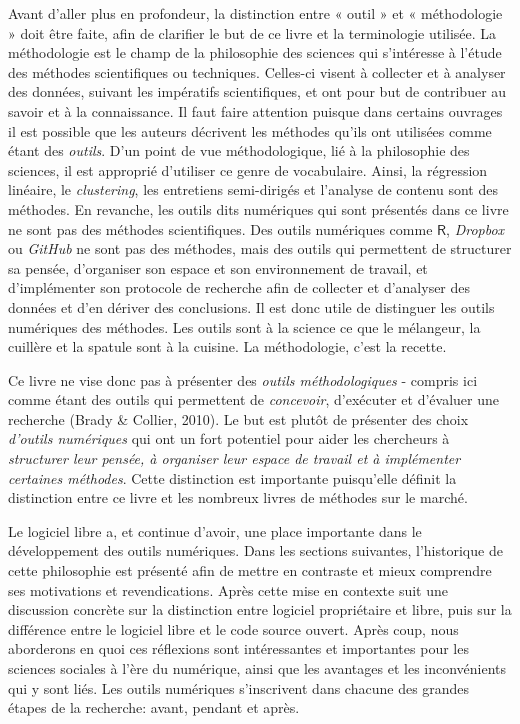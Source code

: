 \documentclass[
  letterpaper,
  DIV=11,
  numbers=noendperiod,
  oneside]{scrreprt}
\begin{document}
Avant d'aller plus en profondeur, la distinction entre « outil » et «
méthodologie » doit être faite, afin de clarifier le but de ce livre et
la terminologie utilisée. La méthodologie est le champ de la philosophie
des sciences qui s'intéresse à l'étude des méthodes scientifiques ou
techniques. Celles-ci visent à collecter et à analyser des données,
suivant les impératifs scientifiques, et ont pour but de contribuer au
savoir et à la connaissance. Il faut faire attention puisque dans
certains ouvrages il est possible que les auteurs décrivent les méthodes
qu'ils ont utilisées comme étant des \emph{outils}. D'un point de vue
méthodologique, lié à la philosophie des sciences, il est approprié
d'utiliser ce genre de vocabulaire. Ainsi, la régression linéaire, le
\emph{clustering}, les entretiens semi-dirigés et l'analyse de contenu
sont des méthodes. En revanche, les outils dits numériques qui sont
présentés dans ce livre ne sont pas des méthodes scientifiques. Des
outils numériques comme \(\textsf{R}\), \emph{Dropbox} ou \emph{GitHub}
ne sont pas des méthodes, mais des outils qui permettent de structurer
sa pensée, d'organiser son espace et son environnement de travail, et
d'implémenter son protocole de recherche afin de collecter et d'analyser
des données et d'en dériver des conclusions. Il est donc utile de
distinguer les outils numériques des méthodes. Les outils sont à la
science ce que le mélangeur, la cuillère et la spatule sont à la
cuisine. La méthodologie, c'est la recette.

Ce livre ne vise donc pas à présenter des \emph{outils méthodologiques}
- compris ici comme étant des outils qui permettent de \emph{concevoir},
d'exécuter et d'évaluer une recherche (Brady \& Collier, 2010). Le but
est plutôt de présenter des choix \emph{d'outils numériques} qui ont un
fort potentiel pour aider les chercheurs à \emph{structurer leur pensée,
à organiser leur espace de travail et à implémenter certaines méthodes}.
Cette distinction est importante puisqu'elle définit la distinction
entre ce livre et les nombreux livres de méthodes sur le marché.

Le logiciel libre a, et continue d'avoir, une place importante dans le
développement des outils numériques. Dans les sections suivantes,
l'historique de cette philosophie est présenté afin de mettre en
contraste et mieux comprendre ses motivations et revendications. Après
cette mise en contexte suit une discussion concrète sur la distinction
entre logiciel propriétaire et libre, puis sur la différence entre le
logiciel libre et le code source ouvert. Après coup, nous aborderons en
quoi ces réflexions sont intéressantes et importantes pour les sciences
sociales à l'ère du numérique, ainsi que les avantages et les
inconvénients qui y sont liés. Les outils numériques s'inscrivent dans
chacune des grandes étapes de la recherche: avant, pendant et après.
\end{document}
